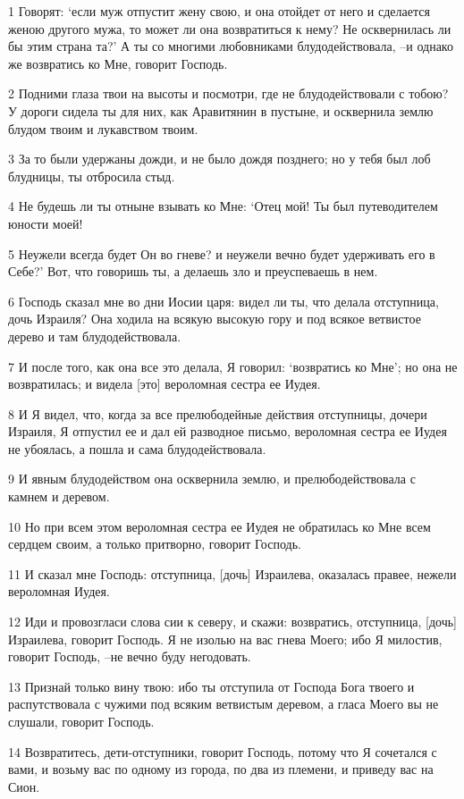 \par 1 Говорят: `если муж отпустит жену свою, и она отойдет от него и сделается женою другого мужа, то может ли она возвратиться к нему? Не осквернилась ли бы этим страна та?' А ты со многими любовниками блудодействовала, --и однако же возвратись ко Мне, говорит Господь.
\par 2 Подними глаза твои на высоты и посмотри, где не блудодействовали с тобою? У дороги сидела ты для них, как Аравитянин в пустыне, и осквернила землю блудом твоим и лукавством твоим.
\par 3 За то были удержаны дожди, и не было дождя позднего; но у тебя был лоб блудницы, ты отбросила стыд.
\par 4 Не будешь ли ты отныне взывать ко Мне: `Отец мой! Ты был путеводителем юности моей!
\par 5 Неужели всегда будет Он во гневе? и неужели вечно будет удерживать его в Себе?' Вот, что говоришь ты, а делаешь зло и преуспеваешь в нем.
\par 6 Господь сказал мне во дни Иосии царя: видел ли ты, что делала отступница, дочь Израиля? Она ходила на всякую высокую гору и под всякое ветвистое дерево и там блудодействовала.
\par 7 И после того, как она все это делала, Я говорил: `возвратись ко Мне'; но она не возвратилась; и видела [это] вероломная сестра ее Иудея.
\par 8 И Я видел, что, когда за все прелюбодейные действия отступницы, дочери Израиля, Я отпустил ее и дал ей разводное письмо, вероломная сестра ее Иудея не убоялась, а пошла и сама блудодействовала.
\par 9 И явным блудодейством она осквернила землю, и прелюбодействовала с камнем и деревом.
\par 10 Но при всем этом вероломная сестра ее Иудея не обратилась ко Мне всем сердцем своим, а только притворно, говорит Господь.
\par 11 И сказал мне Господь: отступница, [дочь] Израилева, оказалась правее, нежели вероломная Иудея.
\par 12 Иди и провозгласи слова сии к северу, и скажи: возвратись, отступница, [дочь] Израилева, говорит Господь. Я не изолью на вас гнева Моего; ибо Я милостив, говорит Господь, --не вечно буду негодовать.
\par 13 Признай только вину твою: ибо ты отступила от Господа Бога твоего и распутствовала с чужими под всяким ветвистым деревом, а гласа Моего вы не слушали, говорит Господь.
\par 14 Возвратитесь, дети-отступники, говорит Господь, потому что Я сочетался с вами, и возьму вас по одному из города, по два из племени, и приведу вас на Сион.
